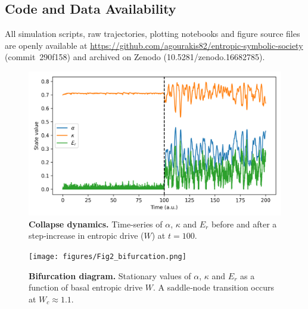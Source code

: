 \subsection*{Code and Data Availability}

All simulation scripts, raw trajectories, plotting notebooks and figure source files are openly available at  
\url{https://github.com/agourakis82/entropic-symbolic-society} (commit 290f158) and archived on Zenodo (10.5281/zenodo.16682785).

\begin{figure}[ht]
\centering
\includegraphics[width=\linewidth]{figures/Fig1_collapse.png}
\caption{\textbf{Collapse dynamics.} Time‑series of $\alpha$, $\kappa$ and $E_r$ before and after a step‑increase in entropic drive ($W$) at $t=100$.}
\label{fig:collapse}
\end{figure}

\begin{figure}[ht]
\centering
\texttt{[image: figures/Fig2\_bifurcation.png]}
\caption{\textbf{Bifurcation diagram.} Stationary values of $\alpha$, $\kappa$ and $E_r$ as a function of basal entropic drive $W$. A saddle‑node transition occurs at $W_c\approx1.1$.}
\label{fig:bifurcation}
\end{figure}